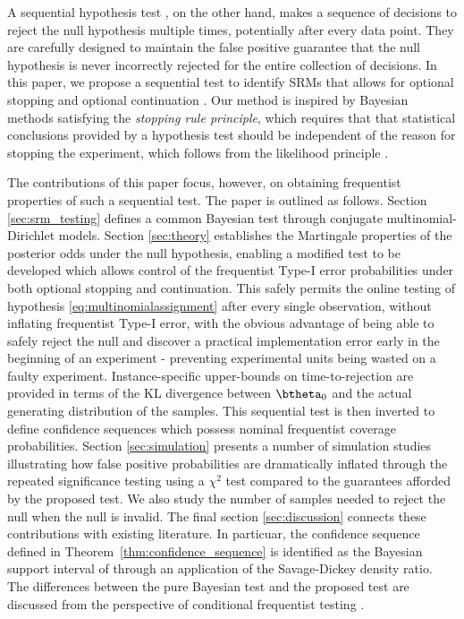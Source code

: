 \documentclass[11pt]{article}
\begin{document}
A sequential hypothesis test \citep{todo}, on the other hand, makes a sequence of decisions to reject the null hypothesis multiple times, potentially after every data point. They are carefully designed to maintain the false positive guarantee that the null hypothesis is never incorrectly rejected for the entire collection of decisions.
In this paper, we propose a sequential test to identify SRMs that allows for optional stopping and optional continuation .
Our method is inspired by Bayesian methods satisfying the \textit{stopping rule principle}, which requires that that statistical conclusions provided by a hypothesis test should be independent of the reason for stopping the experiment, which follows from the likelihood principle \citep{likelihood}.

The contributions of this paper focus, however, on obtaining frequentist properties of such a sequential test.
The paper is outlined as follows.
Section \ref{sec:srm_testing} defines a common Bayesian test through conjugate multinomial-Dirichlet models.
Section \ref{sec:theory} establishes the Martingale properties of the posterior odds under the null hypothesis, enabling a modified test to be developed which allows control of the frequentist Type-I error probabilities under both optional stopping and continuation.
This safely permits the online testing of hypothesis \eqref{eq:multinomialassignment} after every single observation, without inflating frequentist Type-I error, with the obvious advantage of being able to safely reject the null and discover a practical implementation error early in the beginning of an experiment - preventing experimental units being wasted on a faulty experiment.
Instance-specific upper-bounds on time-to-rejection are provided in terms of the KL divergence  between $\btheta_0$ and the actual generating distribution of the samples.
This sequential test is then inverted to define confidence sequences which possess nominal frequentist coverage probabilities.
Section \ref{sec:simulation} presents a number of simulation studies illustrating how false positive probabilities are dramatically inflated through the repeated significance testing using a $\chi^2$ test compared to the guarantees afforded by the proposed test.
We also study the number of samples needed to reject the null when the null is invalid.
The final section \ref{sec:discussion} connects these contributions with existing literature.
In particuar, the confidence sequence defined in Theorem~\ref{thm:confidence_sequence} is identified as the Bayesian support interval of \cite{support_interval} through an application of the Savage-Dickey density ratio.
The differences between the pure Bayesian test and the proposed test are discussed from the perspective of conditional frequentist testing \citep{conditional_frequentist_simple, conditional_frequentist_precise, conditional_frequentist_composite}.
\end{document}

